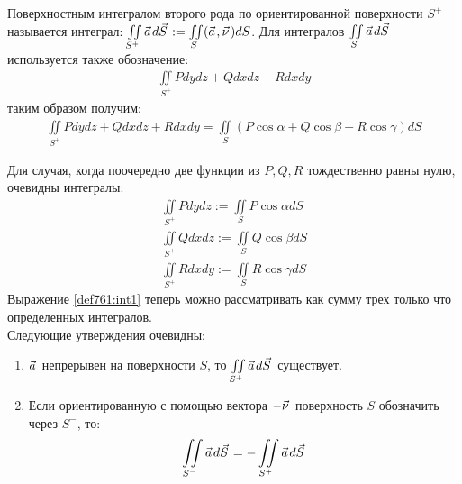 \begin{definition}
  Поверхностным интегралом второго рода по ориентированной поверхности $S^+$
  называется интеграл: $\iint\limits_{S^+} \pvec a d \pvec S := \iint\limits_S
  (\pvec a, \pvec \nu) dS$. Для интегралов $\iint\limits_S \pvec a d \pvec S$
  используется также обозначение:
  \begin{gather}
    \iint\limits_{S^+} P dy dz + Q dx dz + R dx dy
    \label{def761:int1}
  \end{gather}
  таким образом получим:
  \begin{gather}
    \iint\limits_{S^+} P dy dz + Q dx dz + R dx dy = \iint\limits_S (P \cos
    \alpha + Q \cos \beta + R \cos \gamma) dS
    \label{def761:eq1}
  \end{gather}
\end{definition}

Для случая, когда поочередно две функции из $P, Q, R$ тождественно равны нулю,
очевидны интегралы:
\begin{gather}
  \iint\limits_{S^+} P dy dz := \iint\limits_S P \cos \alpha dS \nonumber \\
  \iint\limits_{S^+} Q dx dz := \iint\limits_S Q \cos \beta dS
  \label{ch76:eqs1} \\
  \iint\limits_{S^+} R dx dy := \iint\limits_S R \cos \gamma dS \nonumber
\end{gather}
Выражение \eqref{def761:int1} теперь можно рассматривать как сумму трех только
что определенных интегралов. \\

Следующие утверждения очевидны:
\begin{enumerate}
  \item $\pvec a$ непрерывен на поверхности $S$, то $\iint\limits_{S^+} \pvec a
    d \pvec S$ существует.
  \item Если ориентированную с помощью вектора $-\pvec \nu$ поверхность $S$
    обозначить через $S^-$, то:
    \begin{gather*}
      \iint\limits_{S^-} \pvec a d \pvec S = - \iint\limits_{S^+} \pvec a d
      \pvec S
    \end{gather*}
\end{enumerate}


